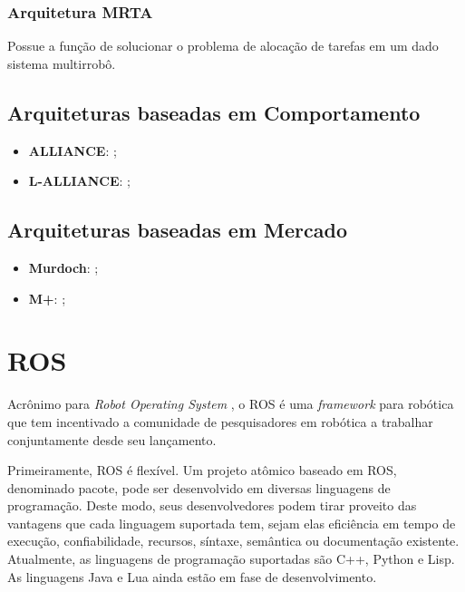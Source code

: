         \subsubsection{Arquitetura MRTA} \label{subsec:arquiteturas_mrta}
            Possue a função de solucionar o problema de alocação de tarefas em um dado sistema multirrobô.
        
            \subsection{Arquiteturas baseadas em Comportamento} \label{subsec:arch_comportamento}
            
            \begin{itemize}
                \item \textbf{ALLIANCE}: \cite{ref:parker1998alliance};
                \item \textbf{L-ALLIANCE}: \cite{ref:parker1996lalliance};
                
            \end{itemize}
            
            \subsection{Arquiteturas baseadas em Mercado} \label{subsec:arch_mercado}
    
            \begin{itemize}
                \item \textbf{Murdoch}: \cite{ref:gerkey2002murdoch};
                \item \textbf{M+}: \cite{ref:botelho1999m+};
                
            \end{itemize}
                
    \section{ROS}
        Acrônimo para \textit{Robot Operating System} \cite{ref:quigley2009ros}, o ROS é uma \textit{framework} para robótica que tem incentivado a comunidade de pesquisadores em robótica a trabalhar conjuntamente desde seu lançamento.
    
        Primeiramente, ROS é flexível. Um projeto atômico baseado em ROS, denominado pacote, pode ser desenvolvido em diversas linguagens de programação. Deste modo, seus desenvolvedores podem tirar proveito das vantagens que cada linguagem suportada tem, sejam elas eficiência em tempo de execução, confiabilidade, recursos, síntaxe, semântica ou documentação existente. Atualmente, as linguagens de programação suportadas são C++, Python e Lisp. As linguagens Java e Lua ainda estão em fase de desenvolvimento.
        
